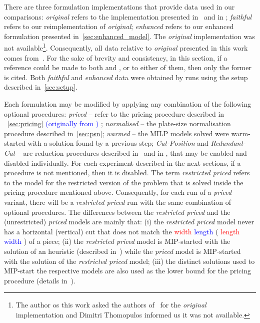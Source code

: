\documentclass[ppgc,tese,english,formais,babel]{iiufrgs}
\newif\iffinalversion
\newcommand{\newtext}[1]{\iffinalversion%
#1%
\else%
\textcolor{blue}{#1}%
\fi%
}
\newcommand{\oldtext}[1]{\iffinalversion%
\else%
\textcolor{red}{#1}%
\fi%
}
\begin{document}
There are three formulation implementations that provide data used in our comparisons:
\emph{original} refers to the implementation presented in~\citet{furini:2016} and in \citet{dimitri_thesis};
\emph{faithful} refers to our reimplementation of \emph{original};
\emph{enhanced} refers to our enhanced formulation presented in~\cref{sec:enhanced_model}.
The \emph{original} implementation was not available\footnote{
	The author os this work asked the authors of~\citet{furini:2016} for the \emph{original} implementation and Dimitri Thomopulos informed us it was not available.
}.
Consequently, all data relative to \emph{original} presented in this work comes from~\citet{dimitri_thesis}.
For the sake of brevity and consistency, in this section, if a reference could be made to both \citet{dimitri_thesis} and \citet{furini:2016}, or to either of them, then only the former is cited.
Both \emph{faithful} and \emph{enhanced} data were obtained by runs using the setup described in~\cref{sec:setup}.

Each formulation may be modified by applying any combination of the following optional procedures:
\emph{priced} -- refer to the pricing procedure described in\newtext{~\cref{sec:pricing} (originally from \citet{dimitri_thesis})}\oldtext{\citet{dimitri_thesis}};
\emph{normalised} -- the plate-size normalisation procedure described in~\cref{sec:psn};
\emph{warmed} -- the MILP models solved were warm-started with a solution found by a previous step;
\emph{Cut-Position} and \emph{Redundant-Cut} -- are reduction procedures described in~\citet{furini:2016} and in \citet{dimitri_thesis}, that may be enabled and disabled individually.
For each experiment described in the next sections, if a procedure is not mentioned, then it is disabled.
The term \emph{restricted priced} refers to the model for the restricted version of the problem that is solved inside the pricing procedure mentioned above.
Consequently, for each run of a \emph{priced} variant, there will be a \emph{restricted priced} run with the same combination of optional procedures.
The differences between the \emph{restricted priced} and the (unrestricted) \emph{priced} models are mainly that:
(i) the \emph{restricted priced} model never has a horizontal (vertical) cut that does not match the \oldtext{width}\newtext{length} (\oldtext{length}\newtext{width}) of a piece;
(ii) the \emph{restricted priced} model is MIP-started with the solution of an heuristic (described in~\citet{dimitri_thesis}) while the \emph{priced} model is MIP-started with the solution of the \emph{restricted priced} model;
(iii) the distinct solutions used to MIP-start the respective models are also used as the lower bound for the pricing procedure (details in~\citet{dimitri_thesis}).
\end{document}
